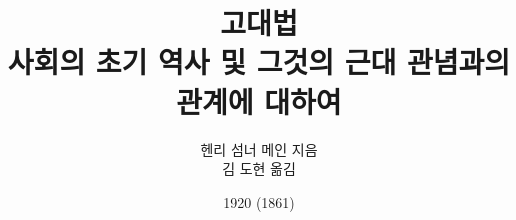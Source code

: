 \documentclass[b5paper]{book}
\begin{document}
\title{고대법\\
\large 사회의 초기 역사 및 그것의 근대 관념과의 관계에 대하여}
\author{헨리 섬너 메인 지음\\
김 도현 옮김}
\date{1920 (1861)}
\maketitle

\mainmatter






\end{document}
